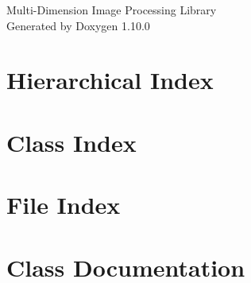 \documentclass[twoside]{book}
\newcommand{\+}{\discretionary{\mbox{\scriptsize$\hookleftarrow$}}{}{}}
\newcommand{\clearemptydoublepage}{%
    \newpage{\pagestyle{empty}\cleardoublepage}%
  }
\begin{document}
  \raggedbottom
    \hypersetup{pageanchor=false,
                bookmarksnumbered=true,
                pdfencoding=unicode
               }
  \begin{titlepage}
  \vspace*{7cm}
  \begin{center}%
  {\Large Multi-\/\+Dimension Image Processing Library}\\
  \vspace*{1cm}
  {\large Generated by Doxygen 1.10.0}\\
  \end{center}
  \end{titlepage}
  \clearemptydoublepage
  \tableofcontents
  \clearemptydoublepage
  \hypersetup{pageanchor=true}




\chapter{Hierarchical Index}

\chapter{Class Index}

\chapter{File Index}

\chapter{Class Documentation}
















\end{document}
